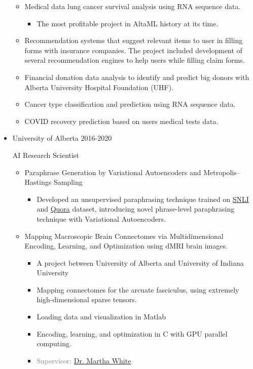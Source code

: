 \documentclass[11pt,a4paper,sans]{moderncv} %
\begin{document}
\begin{itemize}
\begin{itemize}
			\item Medical data lung cancer survival analysis using RNA sequence data.
			\begin{itemize}
			    \item The most profitable project in AltaML history at its time.
			\end{itemize}
			
			\item Recommendation systems that suggest relevant items to user in filling forms with insurance companies. The project included development of several recommendation engines to help users while filling claim forms.
			\item Financial donation data analysis to identify and predict big donors with Alberta University Hospital Foundation (UHF).
			
			\item Cancer type classification and prediction using RNA sequence data.
			\item COVID recovery prediction based on users medical tests data.
			
		\end{itemize}
		
		\item \href{https://ualberta.ca/}{} University of Alberta \hfill 2016-2020
		
        AI Research Scientist
        \begin{itemize}
			\item Paraphrase Generation by Variational Autoencoders and Metropolis--Hastings Sampling
			\begin{itemize}
			    \item Developed an unsupervised paraphrasing technique trained on \href{https://nlp.stanford.edu/projects/snli/}{SNLI} and \href{https://www.kaggle.com/c/quora-question-pairs/data}{Quora} dataset, introducing novel phrase-level paraphrasing technique with Variational Autoencoders.
			\end{itemize}
            \item Mapping Macroscopic Brain Connectomes via Multidimensional Encoding, Learning, and Optimization using dMRI brain images.
    		\begin{itemize}
    		    \item A project between University of Alberta and University of Indiana University
    			\item Mapping connectomes for the arcuate fasciculus, using extremely high-dimensional sparse tensors.
    			\item Loading data and visualization in Matlab
    			\item Encoding, learning, and optimization in C with GPU parallel computing.
    			\item \textcolor{gray}{Supervisor: \href{http://webdocs.cs.ualberta.ca/~whitem/}{Dr. Martha White}}
    		\end{itemize}
    		

\end{itemize}
\end{itemize}
\end{document}
